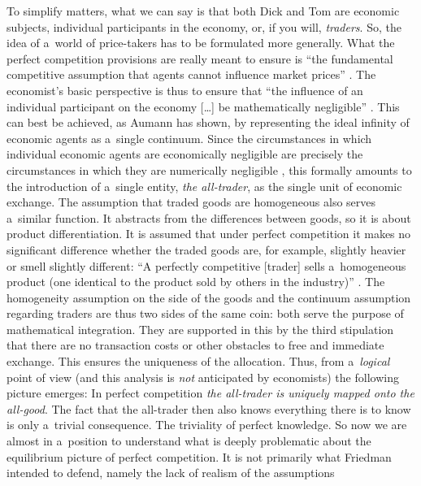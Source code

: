 To simplify matters, what we can say is that both Dick and Tom are economic subjects, individual participants in the economy, or, if you will, \textit{traders}. So, the idea of a~world of price-takers has to be formulated more generally. What the perfect competition provisions are really meant to ensure is ``the fundamental competitive assumption that agents cannot influence market prices'' 
\parencites[][p.225]{safra_strategic_1989}[cf.][]{palgrave_macmillan_perfect_2008}. %
 The economist's basic perspective is thus to ensure that ``the influence of an individual participant on the economy […] be mathematically negligible'' 
\parencite[][p.39]{aumann_markets_1964}. %
 This can best be achieved, as Aumann has shown, by representing the ideal infinity of economic agents as a~single continuum. Since the circumstances in which individual economic agents are economically negligible are precisely the circumstances in which they are numerically negligible 
\parencite[][p.332]{bryant_general_2010}, %
 this formally amounts to the introduction of a~single entity, \textit{the all-trader}, as the single unit of economic exchange. The assumption that traded goods are homogeneous also serves a~similar function. It abstracts from the differences between goods, so it is about product differentiation. It is assumed that under perfect competition it makes no significant difference whether the traded goods are, for example, slightly heavier or smell slightly different: ``A perfectly competitive [trader] sells a~homogeneous product (one identical to the product sold by others in the industry)'' 
\parencite[][p.150]{samuelson_economics_2009}. %
 The homogeneity assumption on the side of the goods and the continuum assumption regarding traders are thus two sides of the same coin: both serve the purpose of mathematical integration. They are supported in this by the third stipulation that there are no transaction costs or other obstacles to free and immediate exchange. This ensures the uniqueness of the allocation. Thus, from a~\textit{logical} point of view (and this analysis is \textit{not} anticipated by economists) the following picture emerges: In perfect competition \textit{the all-trader is uniquely mapped onto the all-good}. The fact that the all-trader then also knows everything there is to know is only a~trivial consequence. The triviality of perfect knowledge. So now we are almost in a~position to understand what is deeply problematic about the equilibrium picture of perfect competition. It is not primarily what Friedman intended to defend, namely the lack of realism of the assumptions 
